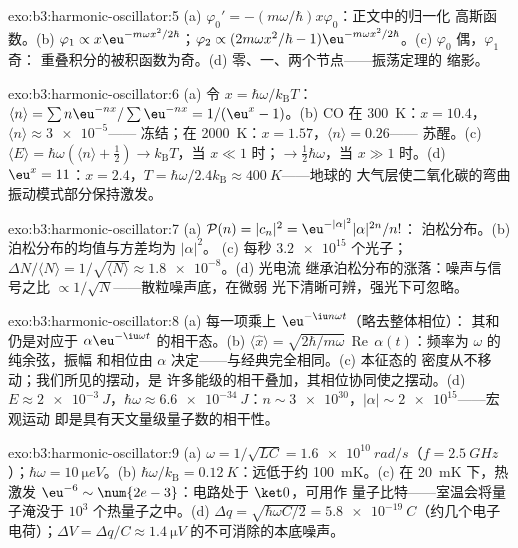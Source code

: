 \begin{solution}{exo:b3:harmonic-oscillator:5}
(a) $\varphi_0' = -(m\omega/\hbar)x\varphi_0$：正文中的归一化
高斯函数。(b) $\varphi_1 \propto x\eu^{-m\omega
x^2/2\hbar}$；$\varphi_2 \propto (2m\omega x^2/\hbar -
1)\eu^{-m\omega x^2/2\hbar}$。(c) $\varphi_0$ 偶，$\varphi_1$ 奇：
重叠积分的被积函数为奇。(d) 零、一、两个节点——振荡定理的
缩影。
\end{solution}

\begin{solution}{exo:b3:harmonic-oscillator:6}
(a) 令 $x = \hbar\omega/k_{\text{B}}T$：$\langle n\rangle =
\sum n\eu^{-nx}/\sum\eu^{-nx} = 1/(\eu^x - 1)$。(b) CO 在
\qty{300}{K}：$x = 10.4$，$\langle n\rangle \approx \num{3e-5}$——
冻结；在 \qty{2000}{K}：$x = 1.57$，$\langle n\rangle = 0.26$——
苏醒。(c) $\langle E\rangle = \hbar\omega(\langle n\rangle +
\tfrac12) \to k_{\text{B}}T$，当 $x \ll 1$ 时；$\to \tfrac12\hbar
\omega$，当 $x \gg 1$ 时。(d) $\eu^x = 11$：$x = 2.4$，$T =
\hbar\omega/2.4k_{\text{B}} \approx \qty{400}{K}$——地球的
大气层使二氧化碳的弯曲振动模式部分保持激发。
\end{solution}

\begin{solution}{exo:b3:harmonic-oscillator:7}
(a) $\mathcal P(n) = |c_n|^2 = \eu^{-|\alpha|^2}|\alpha|^{2n}/n!$：
泊松分布。(b) 泊松分布的均值与方差均为 $|\alpha|^2$。
(c) 每秒 $\num{3.2e15}$ 个光子；$\Delta N/\langle N\rangle =
1/\sqrt{\langle N\rangle} \approx \num{1.8e-8}$。(d) 光电流
继承泊松分布的涨落：噪声与信号之比
$\propto 1/\sqrt N$——散粒噪声底，在微弱
光下清晰可辨，强光下可忽略。
\end{solution}

\begin{solution}{exo:b3:harmonic-oscillator:8}
(a) 每一项乘上 $\eu^{-\iu n\omega t}$（略去整体相位）：
其和仍是对应于 $\alpha\eu^{-\iu\omega t}$ 的相干态。(b)
$\langle\hat x\rangle = \sqrt{2\hbar/m\omega}\,
\operatorname{Re}\,\alpha(t)$：频率为 $\omega$ 的纯余弦，振幅
和相位由 $\alpha$ 决定——与经典完全相同。(c) 本征态的
密度从不移动；我们所见的摆动，是
许多能级的相干叠加，其相位协同使之摆动。(d) $E
\approx \qty{2e-3}{J}$，$\hbar\omega \approx \qty{6.6e-34}{J}$：$n
\sim \num{3e30}$，$|\alpha| \sim \num{2e15}$——宏观运动
即是具有天文量级量子数的相干性。
\end{solution}

\begin{solution}{exo:b3:harmonic-oscillator:9}
(a) $\omega = 1/\sqrt{LC} = \qty{1.6e10}{rad/s}$（$f =
\qty{2.5}{GHz}$）；$\hbar\omega = \qty{10}{\micro eV}$。(b)
$\hbar\omega/k_{\text{B}} = \qty{0.12}{K}$：远低于约
\qty{100}{mK}。(c) 在 \qty{20}{mK} 下，热激发
$\eu^{-6} \sim \num{2e-3}$：电路处于 $\ket0$，可用作
量子比特——室温会将量子淹没于 $10^3$
个热量子之中。(d) $\Delta q = \sqrt{\hbar\omega C/2} =
\qty{5.8e-19}{C}$（约几个电子电荷）；$\Delta V = \Delta q/C
\approx \qty{1.4}{\micro V}$ 的不可消除的本底噪声。
\end{solution}

